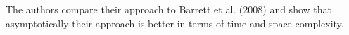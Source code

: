 The authors compare their approach to Barrett et al. (2008)\nocite{barrett2008learning} and show that asymptotically their approach is better in terms of time and space complexity.

























